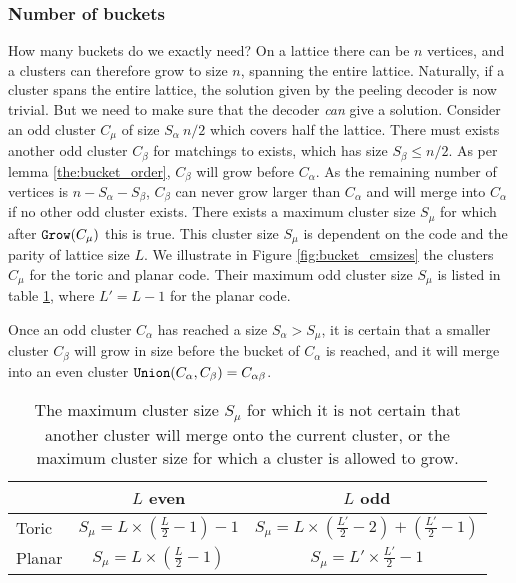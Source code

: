 \subsubsection{Number of buckets}
How many buckets do we exactly need? On a lattice there can be $n$ vertices, and a clusters can therefore grow to size $n$, spanning the entire lattice. Naturally, if a cluster spans the entire lattice, the solution given by the peeling decoder is now trivial. But we need to make sure that the decoder \emph{can} give a solution. Consider an odd cluster $C_\mu$ of size $S_\alpha~n/2$ which covers half the lattice. There must exists another odd cluster $C_\beta$ for matchings to exists, which has size $S_\beta\leq n/2$.
As per lemma \ref{the:bucket_order}, $C_\beta$ will grow before $C_\alpha$. As the remaining number of vertices is $n-S_\alpha-S_\beta$, $C_\beta$ can never grow larger than $C_\alpha$ and will merge into $C_\alpha$ if no other odd cluster exists. There exists a maximum cluster size $S_\mu$ for which after $\texttt{Grow}(C_\mu)$ this is true. This cluster size $S_\mu$ is dependent on the code and the parity of lattice size $L$. We illustrate in Figure \ref{fig:bucket_cmsizes} the clusters $C_\mu$ for the toric and planar code. Their maximum odd cluster size $S_\mu$ is listed in table \ref{tab_smax}, where $L'=L-1$ for the planar code.

\begin{lemma}
  Once an odd cluster $C_\alpha$ has reached a size $S_\alpha > S_\mu$, it is certain that a smaller cluster $C_\beta$ will grow in size before the bucket of $C_\alpha$ is reached, and it will merge into an even cluster $\texttt{Union}(C_\alpha, C_\beta) = C_{\alpha\beta}$.
\end{lemma}

\begin{table}
  \centering
  \begin{tabular}{|l|c|c|}
    \hline
           & $L$ even                             & $L$ odd                                                 \\
    \hline
    Toric  & $S_\mu = L\times (\frac{L}{2}-1) -1$ & $S_\mu = L\times ( \frac{L'}{2} -2) + (\frac{L'}{2}-1)$ \\
    \hline
    Planar & $S_\mu = L \times (\frac{L}{2} -1) $ & $S_\mu = L'\times \frac{L'}{2} -1$                      \\
    \hline
  \end{tabular}
  \caption{The maximum cluster size $S_\mu$ for which it is not certain that another cluster will merge onto the current cluster, or the maximum cluster size for which a cluster is allowed to grow.  }\label{tab_smax}
\end{table}


